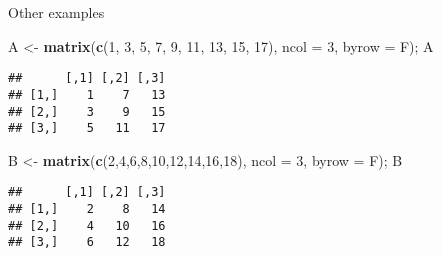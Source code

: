 \documentclass[ignorenonframetext,]{beamer}
\newenvironment{Shaded}{\begin{snugshade}}{\end{snugshade}}
\newcommand{\KeywordTok}[1]{\textcolor[rgb]{0.13,0.29,0.53}{\textbf{#1}}}
\newcommand{\DataTypeTok}[1]{\textcolor[rgb]{0.13,0.29,0.53}{#1}}
\newcommand{\DecValTok}[1]{\textcolor[rgb]{0.00,0.00,0.81}{#1}}
\newcommand{\StringTok}[1]{\textcolor[rgb]{0.31,0.60,0.02}{#1}}
\newcommand{\NormalTok}[1]{#1}
\begin{document}
\begin{frame}[fragile]{Other examples}

\begin{Shaded}
\begin{Highlighting}[]
\NormalTok{A <-}\StringTok{ }\KeywordTok{matrix}\NormalTok{(}\KeywordTok{c}\NormalTok{(}\DecValTok{1}\NormalTok{, }\DecValTok{3}\NormalTok{, }\DecValTok{5}\NormalTok{, }\DecValTok{7}\NormalTok{, }\DecValTok{9}\NormalTok{, }\DecValTok{11}\NormalTok{, }\DecValTok{13}\NormalTok{, }\DecValTok{15}\NormalTok{, }\DecValTok{17}\NormalTok{), }\DataTypeTok{ncol =} \DecValTok{3}\NormalTok{, }
            \DataTypeTok{byrow =}\NormalTok{ F); A}
\end{Highlighting}
\end{Shaded}

\begin{verbatim}
##      [,1] [,2] [,3]
## [1,]    1    7   13
## [2,]    3    9   15
## [3,]    5   11   17
\end{verbatim}

\begin{Shaded}
\begin{Highlighting}[]
\NormalTok{B <-}\StringTok{ }\KeywordTok{matrix}\NormalTok{(}\KeywordTok{c}\NormalTok{(}\DecValTok{2}\NormalTok{,}\DecValTok{4}\NormalTok{,}\DecValTok{6}\NormalTok{,}\DecValTok{8}\NormalTok{,}\DecValTok{10}\NormalTok{,}\DecValTok{12}\NormalTok{,}\DecValTok{14}\NormalTok{,}\DecValTok{16}\NormalTok{,}\DecValTok{18}\NormalTok{), }\DataTypeTok{ncol =} \DecValTok{3}\NormalTok{, }
            \DataTypeTok{byrow =}\NormalTok{ F); B}
\end{Highlighting}
\end{Shaded}

\begin{verbatim}
##      [,1] [,2] [,3]
## [1,]    2    8   14
## [2,]    4   10   16
## [3,]    6   12   18
\end{verbatim}

\end{frame}
\end{document}
